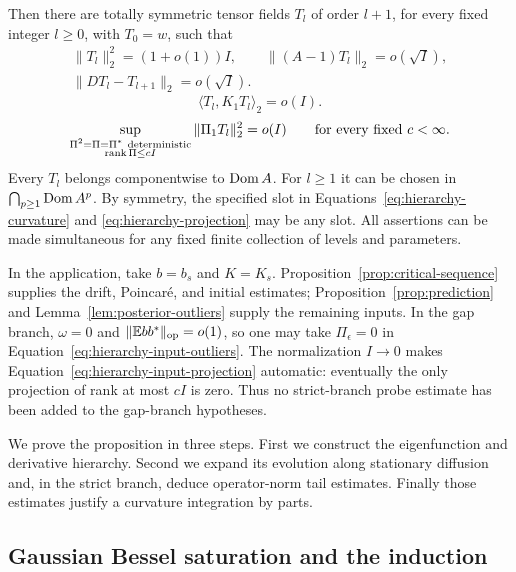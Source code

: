 \begin{proposition}
\begin{enumerate}[label=\textup{(\roman*)}]
\end{enumerate}
Then there are totally symmetric tensor fields $T_l$ of order $l+1$, for
every fixed integer $l\ge0$, with $T_0=w$, such that
\begin{equation}\label{eq:hierarchy-eigen}
 \begin{gathered}
 \|T_l\|_2^2=(1+o(1))I,\qquad
 \|(A-1)T_l\|_2=o(\sqrt I),\\
 \|DT_l-T_{l+1}\|_2=o(\sqrt I).
 \end{gathered}
\end{equation}
\begin{equation}\label{eq:hierarchy-curvature}
 \langle T_l,K_1T_l\rangle_2=o(I).
\end{equation}
\begin{equation}\label{eq:hierarchy-projection}
 \sup_{\substack{\Pi^2=\Pi=\Pi^*\ \mathrm{deterministic}\\
                   \operatorname{rank}\Pi\le cI}}
      \|\Pi_1T_l\|_2^2=o(I)
 \qquad\text{for every fixed }c<\infty.
\end{equation}
Every $T_l$ belongs componentwise to $\operatorname{Dom} A$.  For $l\ge1$ it can be
chosen in $\bigcap_{p\ge1}\operatorname{Dom} A^p$.  By symmetry, the specified slot in
Equations~\eqref{eq:hierarchy-curvature} and
\eqref{eq:hierarchy-projection} may be any slot.  All assertions can be
made simultaneous for any fixed finite collection of levels and parameters.
\end{proposition}

In the application, take $b=b_s$ and $K=K_s$.  Proposition~\ref{prop:critical-sequence}
supplies the drift, Poincar\'e, and initial estimates;
Proposition~\ref{prop:prediction} and Lemma~\ref{lem:posterior-outliers}
supply the remaining inputs.  In the gap branch, $\omega=0$ and
$\|\mathbb E bb^*\|_{\mathrm{op}}=o(1)$, so one may take $\Pi_\epsilon=0$ in
Equation~\eqref{eq:hierarchy-input-outliers}.  The normalization $I\to0$
makes Equation~\eqref{eq:hierarchy-input-projection} automatic: eventually
the only projection of rank at most $cI$ is zero.  Thus no strict-branch
probe estimate has been added to the gap-branch hypotheses.

We prove the proposition in three steps.  First we construct the
eigenfunction and derivative hierarchy.  Second we expand its evolution
along stationary diffusion and, in the strict branch, deduce operator-norm
tail estimates.  Finally those estimates justify a curvature integration
by parts.

\subsection{Gaussian Bessel saturation and the induction}

